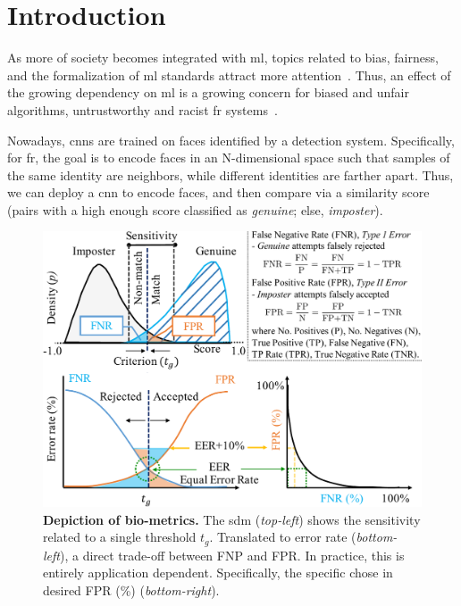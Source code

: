 
\glsresetall
\section{Introduction}
    As more of society becomes integrated with \gls{ml}, topics related to bias, fairness, and the formalization of \gls{ml} standards attract more attention~\cite{10.1007/978-3-030-13469-3_68, anne2018women, wang2018racial}. Thus, an effect of the growing dependency on \gls{ml} is a growing concern for biased and unfair algorithms, \eg untrustworthy and racist \gls{fr} systems~\cite{england2019, nagpal2019deep,snow2018}.
    


    Nowadays, \glspl{cnn} are trained on faces identified by a detection system. Specifically, for \gls{fr}, the goal is to encode faces in an N-dimensional space such that samples of the same identity are neighbors, while different identities are farther apart. Thus, we can deploy a \gls{cnn} to encode faces, and then compare via a similarity score (\ie pairs with a high enough score classified as \emph{genuine}; else, \emph{imposter}). 

\begin{figure}
    \centering
    \includegraphics[width=\linewidth]{figures/fig1-crop.pdf}
    \caption{\small{\textbf{Depiction of bio-metrics.} The \gls{sdm} (\emph{top-left}) shows the sensitivity related to a single threshold $t_g$. Translated to error rate (\emph{bottom-left}), a direct trade-off between FNP and FPR. In practice, this is entirely application dependent. Specifically, the specific chose in desired FPR (\%) (\emph{bottom-right}).}}
    \label{fig:biometrics}
\end{figure}

